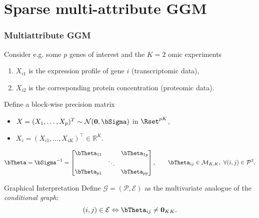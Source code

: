 \section{Sparse multi-attribute GGM}

\begin{frame}
  \frametitle{Multiattribute GGM}

    Consider e.g. some $p$ genes of interest and the $K=2$ omic experiments
    \begin{enumerate}
    \item $X_{i1}$ is the expression profile of gene $i$ (transcriptomic data),
    \item $X_{i2}$ is the corresponding protein concentration (proteomic data).
    \end{enumerate}

    \vfill

  \begin{block}{Define a block-wise precision matrix}
      \vspace{-.25cm}
      \begin{itemize}
      \item  $X =  (X_1,  \dots,  X_p)^T \sim  \mathcal{N}(\mathbf{0},
        \bSigma)$ in $\Rset^{pK}$,
      \item $X_i=(X_{i1},\dots,X_{iK})^\intercal \in \mathbb{R}^K$.
      \end{itemize}
      \[
      \bTheta = \bSigma^{-1} = \begin{bmatrix}
        \bTheta_{11} & & \bTheta_{1p} \\
        & \ddots & \\
        \bTheta_{p1} & & \bTheta_{pp} \\
      \end{bmatrix}, \qquad  \bTheta_{ij} \in \mathcal{M}_{K,K},
      \ \forall (i,j)\in\mathcal{P}^2.
      \]
    \end{block}

    \vfill

    \begin{beamerboxesrounded}[upper=sur:head,lower=sur:bloc,shadow=true]{Graphical Interpretation}
      Define  $\mathcal{G}=(\mathcal{P},\mathcal{E})$   as  \alert{the
        multivariate analogue} of the {\it conditional graph}:
      \vspace{-.25cm}
      \begin{equation*}
        (i,j)\in    \mathcal{E}    \Leftrightarrow    \bTheta_{ij}    \ne
        \mathbf{0}_{KK}.
      \end{equation*}
    \end{beamerboxesrounded}

\end{frame}

